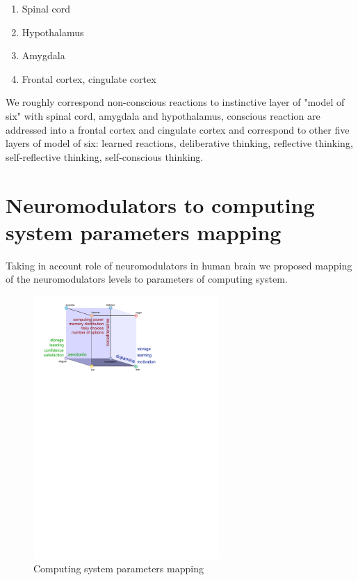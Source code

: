 \begin{enumerate}
 \item  Spinal cord
 \item  Hypothalamus
 \item  Amygdala
 \item  Frontal cortex, cingulate cortex
\end{enumerate}

We roughly correspond non-conscious reactions to instinctive layer of "model of six" \cite{emotionmachine} with spinal cord, amygdala and hypothalamus, conscious reaction are addressed into a frontal cortex and cingulate cortex and correspond to other five layers of model of six: learned reactions, deliberative thinking, reflective thinking, self-reflective thinking, self-conscious thinking.

\section{Neuromodulators to computing system parameters mapping}

Taking in account role of neuromodulators in human brain \cite{cubeofemotions, emotionsbraintorobot, neuromodulatory} we proposed mapping of the neuromodulators levels to parameters of computing system.

\begin{figure}
\begin{center}
 \includegraphics[height=10cm]{figure3_cube_of_parameters}
\end{center}
\caption{Computing system parameters mapping}
\label{figure3_cube_of_parameters}
\end{figure}

